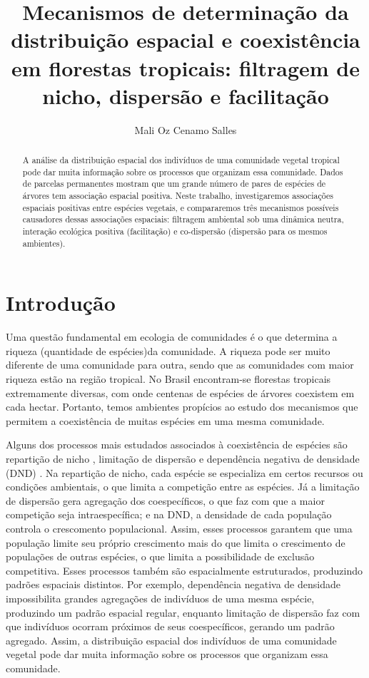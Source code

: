 \documentclass[twoside,12pt,a4paper]{report}
\begin{document}
\title{Mecanismos de determinação da distribuição espacial e coexistência em florestas tropicais:
filtragem de nicho, dispersão e facilitação}
\author{Mali Oz Cenamo Salles}


\begin{abstract}

A análise da distribuição espacial dos indivíduos de uma comunidade vegetal tropical pode dar muita
informação sobre os processos que organizam essa comunidade. Dados de parcelas permanentes mostram
que um grande número de pares de espécies de árvores tem associação espacial positiva. Neste
trabalho, investigaremos associações espaciais positivas entre espécies vegetais, e compararemos
três mecanismos possíveis causadores dessas associações espaciais: filtragem ambiental sob uma
dinâmica neutra, interação ecológica positiva (facilitação) e co-dispersão (dispersão para os mesmos
ambientes).

\end{abstract}

\section{Introdução}

Uma questão fundamental em ecologia de comunidades é o que determina a riqueza (quantidade de
espécies)da comunidade. 
A riqueza pode ser muito diferente de uma comunidade para outra, sendo que as comunidades com
maior riqueza estão na região tropical.
No Brasil encontram-se florestas tropicais extremamente diversas, com onde centenas de
espécies de árvores coexistem em cada hectar. Portanto, temos ambientes propícios ao estudo dos mecanismos
que permitem a coexistência de muitas espécies em uma mesma comunidade.

Alguns dos processos mais estudados associados à coexistência de espécies são repartição de
nicho \citep{Hutchinson1957}, limitação de dispersão \citep{HurttPacala1995} e dependência
negativa de densidade (DND)
\citep{refs}. 
Na repartição de nicho, cada espécie se especializa em certos recursos ou condições
ambientais, o que limita a competição entre as espécies. Já a limitação de dispersão gera
agregação dos coespecíficos, o que faz com que a maior competição seja intraespecífica; e na
DND, a densidade de cada população controla o crescomento populacional.
Assim, esses processos garantem que uma população limite seu próprio crescimento mais do que limita o
crescimento de populações de outras espécies, o que limita a possibilidade de exclusão
competitiva.
Esses processos também são espacialmente
estruturados, produzindo padrões espaciais distintos. Por exemplo, dependência negativa de
densidade impossibilita grandes agregações de indivíduos de uma mesma espécie,
produzindo um padrão espacial regular, enquanto limitação de dispersão faz com que
indivíduos ocorram próximos de seus coespecíficos, gerando um padrão agregado.
Assim, a distribuição espacial dos indivíduos de uma comunidade vegetal pode dar muita
informação sobre os processos que organizam essa comunidade. 
\end{document}
